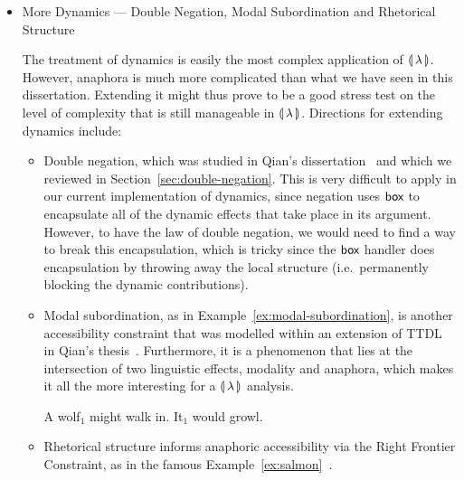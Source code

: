 \begin{itemize}
  \begin{exe}
  [*]{It$_1$ loves every owner of a dog$_1$.}
  \end{exe}

  Crossover issues with inverse scope readings are an old
  problem~\cite{shan2006explaining} and therefore a solution which improves
  coverage without incurring extra complexity to the rest of the grammar
  would be of great interest.

  
\item More Dynamics --- Double Negation, Modal Subordination and Rhetorical
  Structure

  The treatment of dynamics is easily the most complex application of
  ${\llparenthesis \, \lambda \, \rrparenthesis}$. However, anaphora is much more complicated than what we have
  seen in this dissertation. Extending it might thus prove to be a good
  stress test on the level of complexity that is still manageable in
  ${\llparenthesis \, \lambda \, \rrparenthesis}$. Directions for extending dynamics include:

  \begin{itemize}
  \item Double negation, which was studied in Qian's
    dissertation~\cite{qian2014accessibility} and which we reviewed in
    Section~\ref{sec:double-negation}. This is very difficult to apply in
    our current implementation of dynamics, since negation uses $\textsf{box}$ to
    encapsulate all of the dynamic effects that take place in its
    argument. However, to have the law of double negation, we would need to
    find a way to break this encapsulation, which is tricky since the
    $\textsf{box}$ handler does encapsulation by throwing away the local structure
    (i.e.\ permanently blocking the dynamic contributions).

  \item Modal subordination, as in Example~\ref{ex:modal-subordination}, is
    another accessibility constraint that was modelled within an extension
    of TTDL in Qian's thesis~\cite{qian2014accessibility}. Furthermore, it
    is a phenomenon that lies at the intersection of two linguistic
    effects, modality and anaphora, which makes it all the more interesting
    for a ${\llparenthesis \, \lambda \, \rrparenthesis}$ analysis.

    \begin{exe}
      \ex A wolf$_1$ might walk in. It$_1$ would
      growl. \label{ex:modal-subordination}
    \end{exe}

  \item Rhetorical structure informs anaphoric accessibility via the Right
    Frontier Constraint, as in the famous
    Example~\ref{ex:salmon}~\cite{asher2003logics}.


\end{itemize}
\end{itemize}
